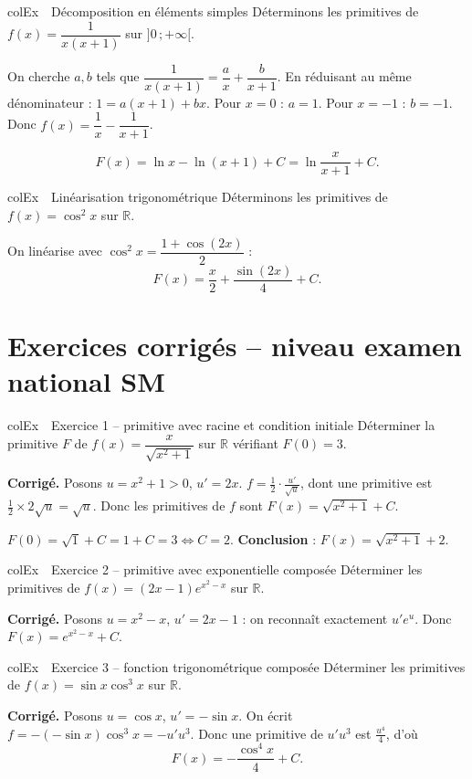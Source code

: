 \documentclass[11pt,a4paper]{article}
\newenvironment{exemple}[1][Exemple]
  {\begin{fiche}{colEx}{\ding{217}~~#1}}{\end{fiche}}
\begin{document}
\begin{exemple}[Décomposition en éléments simples]
Déterminons les primitives de $f(x)=\dfrac{1}{x(x+1)}$ sur $]0\,;+\infty[$.

\smallskip
On cherche $a,b$ tels que $\dfrac{1}{x(x+1)}=\dfrac ax+\dfrac{b}{x+1}$. En réduisant au même dénominateur : $1=a(x+1)+bx$. Pour $x=0$ : $a=1$. Pour $x=-1$ : $b=-1$. Donc $f(x)=\dfrac1x-\dfrac1{x+1}$.

\smallskip
\[
  F(x) = \ln x - \ln(x+1)+C = \ln\frac{x}{x+1}+C.
\]
\end{exemple}

\begin{exemple}[Linéarisation trigonométrique]
Déterminons les primitives de $f(x)=\cos^2 x$ sur $\mathbb{R}$.

\smallskip
On linéarise avec $\cos^2x=\dfrac{1+\cos(2x)}{2}$ :
\[
  F(x) = \frac{x}{2}+\frac{\sin(2x)}{4}+C.
\]
\end{exemple}

\section{Exercices corrigés -- niveau examen national SM}

\begin{exemple}[Exercice 1 -- primitive avec racine et condition initiale]
Déterminer la primitive $F$ de $f(x)=\dfrac{x}{\sqrt{x^2+1}}$ sur $\mathbb{R}$ vérifiant $F(0)=3$.

\smallskip
\textbf{Corrigé.} Posons $u=x^2+1>0$, $u'=2x$. $f=\frac12\cdot\frac{u'}{\sqrt u}$, dont une primitive est $\frac12\times2\sqrt u=\sqrt u$. Donc les primitives de $f$ sont $F(x)=\sqrt{x^2+1}+C$.

\smallskip
$F(0)=\sqrt1+C=1+C=3\iff C=2$. \textbf{Conclusion} : $F(x)=\sqrt{x^2+1}+2$.
\end{exemple}

\begin{exemple}[Exercice 2 -- primitive avec exponentielle composée]
Déterminer les primitives de $f(x)=(2x-1)e^{x^2-x}$ sur $\mathbb{R}$.

\smallskip
\textbf{Corrigé.} Posons $u=x^2-x$, $u'=2x-1$ : on reconnaît exactement $u'e^u$. Donc $F(x)=e^{x^2-x}+C$.
\end{exemple}

\begin{exemple}[Exercice 3 -- fonction trigonométrique composée]
Déterminer les primitives de $f(x)=\sin x\cos^3x$ sur $\mathbb{R}$.

\smallskip
\textbf{Corrigé.} Posons $u=\cos x$, $u'=-\sin x$. On écrit $f=-(-\sin x)\cos^3x=-u'u^3$. Donc une primitive de $u'u^3$ est $\frac{u^4}{4}$, d'où
\[
  F(x) = -\frac{\cos^4x}{4}+C.
\]
\end{exemple}
\end{document}
